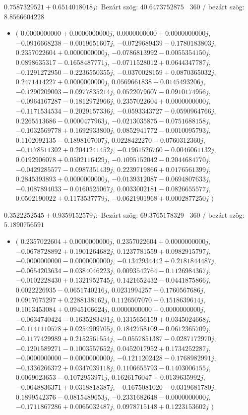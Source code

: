 \documentclass[14pt,a4paper]{article}
\begin{document}
$0.7587329521+0.6514018018j$:\
Bezárt szög: $40.6473752875$ \
360 / bezárt szög: $8.8566604228$\
\begin{itemize}
\item
$\big($
$0.0000000000+0.0000000000j$, $0.0000000000+0.0000000000j$, $-0.0916668238-0.0019651607j$, $-0.0729689439-0.1780183803j$, $0.2357022604+0.0000000000j$, $-0.0786813992-0.0055354150j$, $0.0898635317-0.1658487771j$, $-0.0711528012+0.0644347787j$, $-0.1291272950-0.2236550355j$, $-0.0370028159+0.0870365032j$, $0.2471414227+0.0000000000j$, $0.0569661838+0.0145493206j$, $-0.1290209003-0.0977835214j$, $0.0522079607-0.0910174956j$, $-0.0964167287-0.1812972966j$, $0.2357022604+0.0000000000j$, $-0.1171534534-0.2029157336j$, $-0.0593343727-0.0590964766j$, $0.2265513686-0.0000477963j$, $-0.0213035875-0.0751688158j$, $-0.1032569778+0.1692933800j$, $0.0852941772-0.0010095793j$, $0.1102092135-0.1898107007j$, $0.0228422270-0.0760312360j$, $-0.1178511302+0.2041241452j$, $-0.1961526760-0.0046061132j$, $0.0192906078+0.0502116429j$, $-0.1095152042-0.2044684770j$, $-0.0429285577-0.0987351439j$, $0.2239719866+0.0176561399j$, $0.2845393893+0.0000000000j$, $-0.0139312087-0.0694807633j$, $-0.1087894033-0.0160525067j$, $0.0033002181-0.0826655577j$, $0.0502190022+0.1173537779j$, $-0.0621901968+0.0002877250j$
$\big)$
\end{itemize}
$0.3522252545+0.9359152579j$:\
Bezárt szög: $69.3765178329$ \
360 / bezárt szög: $5.1890756591$\
\begin{itemize}
\item
$\big($
$0.2357022604+0.0000000000j$, $0.2357022604+0.0000000000j$, $-0.0678728892+0.1901264682j$, $0.1237781559+0.0982915797j$, $-0.0000000000-0.0000000000j$, $-0.1342934442+0.2181844487j$, $-0.0654203634-0.0384046223j$, $0.0093542764-0.1126984367j$, $-0.0102228430+0.1321952745j$, $0.1421652432-0.0441875866j$, $0.0022226935-0.0651740216j$, $0.0231994257-0.1760567686j$, $0.0917675297+0.2288138162j$, $0.1126507070-0.1518639614j$, $0.1013453084+0.0945106624j$, $0.0000000000-0.0000000000j$, $-0.0634740424-0.1635283491j$, $0.1315656159+0.0345024668j$, $-0.1141110578+0.0254909705j$, $0.1842758109-0.0612365709j$, $-0.1177429989+0.2152561554j$, $-0.0557851387-0.0287172970j$, $-0.1201589271-0.1003557652j$, $0.0452017952+0.1734252287j$, $-0.0000000000-0.0000000000j$, $-0.1211202428-0.1768982991j$, $-0.1336266372+0.0347039118j$, $0.1106655793-0.1403006155j$, $0.0069023653-0.1072953971j$, $0.1626176047+0.0139635992j$, $-0.0048836371+0.0318818387j$, $-0.1675081020-0.0319681780j$, $0.1899542376-0.0815489653j$, $-0.2331682648-0.0000000000j$, $-0.1711867286+0.0065032487j$, $0.0978715148+0.1223153602j$
$\big)$
\end{itemize}
\end{document}
